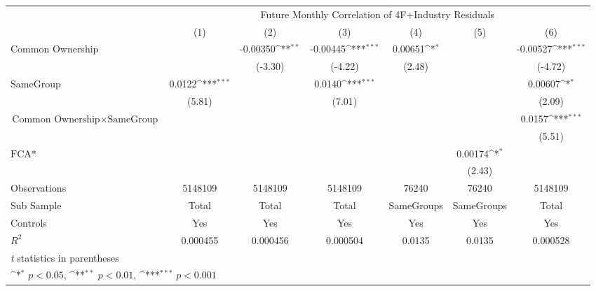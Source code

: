 {
\def\sym#1{\ifmmode^{#1}\else\(^{#1}\)\fi}
\begin{tabular}{l*{6}{c}}
\hline\hline
                &\multicolumn{6}{c}{Future Monthly Correlation of 4F+Industry Residuals}                                          \\\cmidrule(lr){2-7}
                &\multicolumn{1}{c}{(1)}         &\multicolumn{1}{c}{(2)}         &\multicolumn{1}{c}{(3)}         &\multicolumn{1}{c}{(4)}         &\multicolumn{1}{c}{(5)}         &\multicolumn{1}{c}{(6)}         \\
\hline
 Common Ownership &                  & -0.00350\sym{**} & -0.00445\sym{***}&  0.00651\sym{*}  &                  & -0.00527\sym{***}\\
                &                  &  (-3.30)         &  (-4.22)         &   (2.48)         &                  &  (-4.72)         \\
[1em]
SameGroup       &   0.0122\sym{***}&                  &   0.0140\sym{***}&                  &                  &  0.00607\sym{*}  \\
                &   (5.81)         &                  &   (7.01)         &                  &                  &   (2.09)         \\
[1em]
 $ \text{Common Ownership} \times  {\text{SameGroup} }  $ &                  &                  &                  &                  &                  &   0.0157\sym{***}\\
                &                  &                  &                  &                  &                  &   (5.51)         \\
[1em]
$ \text{FCA*} $ &                  &                  &                  &                  &  0.00174\sym{*}  &                  \\
                &                  &                  &                  &                  &   (2.43)         &                  \\
\hline
Observations    &  5148109         &  5148109         &  5148109         &    76240         &    76240         &  5148109         \\
Sub Sample      &    Total         &    Total         &    Total         &SameGroups         &SameGroups         &    Total         \\
Controls        &      Yes         &      Yes         &      Yes         &      Yes         &      Yes         &      Yes         \\
$ R^2 $         & 0.000455         & 0.000456         & 0.000504         &   0.0135         &   0.0135         & 0.000528         \\
\hline\hline
\multicolumn{7}{l}{\footnotesize \textit{t} statistics in parentheses}\\
\multicolumn{7}{l}{\footnotesize \sym{*} \(p<0.05\), \sym{**} \(p<0.01\), \sym{***} \(p<0.001\)}\\
\end{tabular}
}
